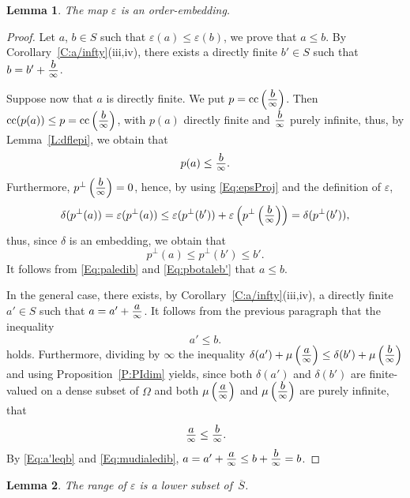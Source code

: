 \documentclass[psamsfonts,reqno]{memo-l}
\theoremstyle{plain}
\newtheorem{lemma}{Lemma}[section]
\theoremstyle{definition}
\theoremstyle{remark}
\numberwithin{equation}{section}
\newcommand{\eps}{\varepsilon}
\newcommand{\ol}[1]{\,\overline{\!#1}}
\newcommand{\di}[1]{\tfrac{\mathstrut\textstyle{#1}}{\scriptstyle{\infty}}}
\newcommand{\pdi}[1]{\left(\di{#1}\right)}
\DeclareMathOperator{\cc}{cc}
\begin{document}
\begin{lemma}\label{L:epsEmb}
The map $\eps$ is an order-embedding.
\end{lemma}

\begin{proof}
Let $a$, $b\in S$ such that $\eps(a)\leq\eps(b)$, we prove
that $a\leq b$. By Corollary~\ref{C:a/infty}(iii,iv), there exists a directly
finite $b'\in S$ such that $b=b'+\di{b}$.

Suppose now that $a$ is directly finite. We put
$p=\cc\pdi{b}$. Then
$\cc(p(a))\leq p=\cc\pdi{b}$, with $p(a)$ directly
finite and $\di{b}$ purely infinite, thus, by Lemma~\ref{L:dflepi}, we
obtain that
   \begin{equation}\label{Eq:paledib}
   p(a)\leq\di{b}.
   \end{equation}
Furthermore, $p^\bot\pdi{b}=0$, hence, by using \eqref{Eq:epsProj} and the
definition of $\eps$,
   \[
   \delta(p^\bot(a))=\eps(p^\bot(a))\leq
   \eps(p^\bot(b'))+\eps\left(p^\bot\pdi{b}\right)
   =\delta(p^\bot(b')),
   \]
thus, since $\delta$ is an embedding, we obtain that
   \begin{equation}\label{Eq:pbotaleb'}
   p^\bot(a)\leq p^\bot(b')\leq b'.
   \end{equation}
It follows from \eqref{Eq:paledib} and \eqref{Eq:pbotaleb'} that
$a\leq b$.

In the general case, there exists, by Corollary~\ref{C:a/infty}(iii,iv), a
directly finite $a'\in S$ such that $a=a'+\di{a}$. It
follows from the previous paragraph that the inequality
   \begin{equation}\label{Eq:a'leqb}
   a'\leq b.
   \end{equation}
holds. Furthermore, dividing by $\infty$ the inequality
$\delta(a')+\mu\pdi{a}\leq\delta(b')+\mu\pdi{b}$ and using
Proposition~\ref{P:PIdim} yields, since both $\delta(a')$ and $\delta(b')$
are finite-valued on a dense subset of $\Omega$ and both $\mu\pdi{a}$ and
$\mu\pdi{b}$ are purely infinite, that
   \begin{equation}\label{Eq:mudialedib}
   \di{a}\leq\di{b}.
   \end{equation}
By \eqref{Eq:a'leqb} and \eqref{Eq:mudialedib}, $a=a'+\di{a}\leq b+\di{b}=b$.
\end{proof}


\begin{lemma}\label{L:epsId}
The range of $\eps$ is a lower subset of $\ol{S}$.
\end{lemma}
\end{document}
